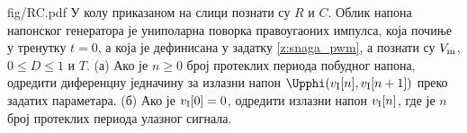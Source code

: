 
\noindent\mnDifficult
\begin{slikaDesno}{fig/RC.pdf}
    \PID 
    У колу приказаном на слици познати су $R$ и $C$. Облик напона напонског генератора је 
    униполарна поворка правоугаоних импулса, која почиње у тренутку $t=0$, 
    а која је дефинисана у задатку \ref{z:snaga_pwm}, а познати су $V_{\rm m}$, $0 \leq D \leq 1$ и $T$. 
    (а) Ако је $n \geq 0$ број протеклих периода побудног напона, одредити диференцну једначину за излазни напон 
    $\Upphi(v_{\rm I}[n], v_{\rm I}[n+1])$ преко задатих параметара.
    (б) Ако је $v_{\rm I}[0] = 0$, одредити излазни напон $v_{\rm I}[n]$, где је $n$ број протеклих периода улазног сигнала.     
\end{slikaDesno} \\[5mm]

\RESENJE

